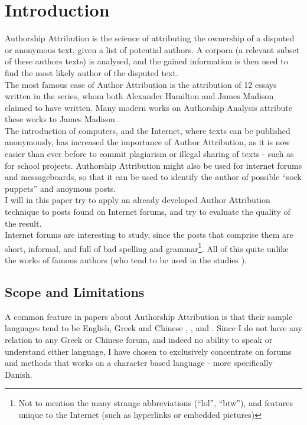 \section{Introduction}
\label{introduction}
Authorship Attribution is the science of attributing the ownership of a disputed or anonymous text, given a list of potential authors. A corpora (a relevant subset of these authors texts) is analysed, and the gained information is then used to find the most likely author of the disputed text.\\

The most famous case of Author Attribution is the attribution of 12 essays written in the  series, whom both Alexander Hamilton and James Madison claimed to have written. Many modern works on Authorship Analysis attribute these works to James Madison \cite{Fung03thedisputed}.\\
 The introduction of computers, and the Internet, where texts can be published anonymously, has increased the importance of Author Attribution, as it is now easier than ever before to commit plagiarism or illegal sharing of texts - such as for school projects. Authorship Attribution might also be used for internet forums and messageboards, so that it can be used to identify the author of possible ``sock puppets''  and anoymous posts.\\ 

I will in this paper try to apply an already developed Author Attribution technique to posts found on Internet forums, and try to evaluate the quality of the result.\\

Internet forums are interesting to study, since the posts that comprise them are short, informal, and full of bad spelling and grammar\footnote{Not to mention the many strange abbreviations (``lol'', ``btw''), and features unique to the Internet (such as hyperlinks or embedded pictures)}. All of this quite unlike the works of famous authors (who tend to be used in the studies \cite{nr4}). 

\subsection{Scope and Limitations}
\label{scope}
A common feature in papers about Authorship Attribution is that their sample languages tend to be English, Greek and Chinese \cite{syntactic}, \cite{nr2}, \cite{nr4} and \cite{app-spe}. Since I do not have any relation to any Greek or Chinese forum, and indeed no ability to speak or understand either language, I have chosen to exclusively concentrate on forums and methods that works on a character based language - more specifically Danish.

